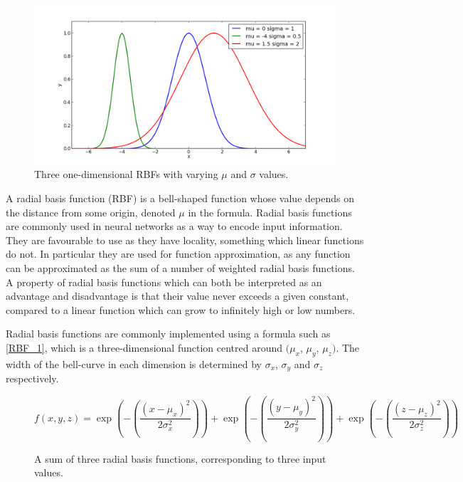 \documentclass[a4paper,11pt]{kth-mag}
\begin{document}
\begin{figure}
\centering\includegraphics[scale=0.5]{rbf_1d.png}
\caption{Three one-dimensional RBFs with varying $\mu$ and $\sigma$ values.}
\label{3-rbf-functions}
\end{figure}

A radial basis function (RBF) is a bell-shaped function whose value depends on the distance from some origin, denoted $\mu$ in the formula.  Radial basis functions are commonly used in neural networks as a way to encode input information. They are favourable to use as they have locality, something which linear functions do not. In particular they are used for function approximation, as any function can be approximated as the sum of a number of weighted radial basis functions. A property of radial basis functions which can both be interpreted as an advantage and disadvantage is that their value never exceeds a given constant, compared to a linear function which can grow to infinitely high or low numbers.

Radial basis functions are commonly implemented using a formula such as \ref{RBF_1}, which is a three-dimensional function centred around $(\mu _{x}$, $\mu _{y}$, $\mu _{z})$. The width of the bell-curve in each dimension is determined by $\sigma _{x}$, $\sigma _{y}$ and $\sigma _{z}$ respectively.

\begin{figure}
\begin{equation}
f(x,y,z) = \exp(-(\frac{(x-\mu_{x})^{2}}{2 \sigma _{x}^{2}})) + \exp(-(\frac{(y-\mu_{y})^{2}}{2 \sigma _{y}^{2}})) + \exp(-(\frac{(z-\mu_{z})^{2}}{2 \sigma _{z}^{2}}))
\end{equation}
\caption{A sum of three radial basis functions, corresponding to three input values.}
\label{RBF-1}
\end{figure}
\end{document}
